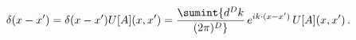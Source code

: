 \begin{equation}
  \label{eq:deltaprelim}
\delta(x-x') = \delta(x-x') U[A](x,x') 
= \sumint  {d^{D}k \over (2 \pi)^{D}} \, e^{i k \cdot (x - x')} \, U[A](x,x') \,.
\end{equation}

